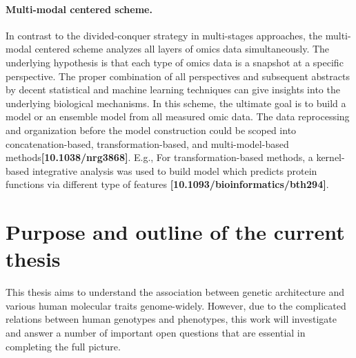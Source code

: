 \documentclass[12pt,usletter,fancy]{elegantbook}
\begin{document}
\paragraph*{Multi-modal centered scheme.}
In contrast to the divided-conquer strategy in multi-stages approaches, the multi-modal centered scheme analyzes all layers of omics data simultaneously.
The underlying hypothesis is that each type of omics data is a snapshot at a specific perspective.
The proper combination of all perspectives and subsequent abstracts by decent statistical and machine learning techniques can give insights into the underlying biological mechanisms.
In this scheme, the ultimate goal is to build a model or an ensemble model from all measured omic data.
The data reprocessing and organization before the model construction could be scoped into concatenation-based, transformation-based, and multi-model-based methods\textbf{[10.1038/nrg3868]}.
E.g., For transformation-based methods, a kernel-based integrative analysis was used to build model which predicts protein functions via different type of features \textbf{[10.1093/bioinformatics/bth294]}.

\begin{figure}[h]
  \centering
\end{figure}

\section*{Purpose and outline of the current thesis}
This thesis aims to understand the association between genetic architecture and various human molecular traits genome-widely.
However, due to the complicated relations between human genotypes and phenotypes, this work will investigate and answer a number of important open questions that are essential in completing the full picture.
\end{document}
